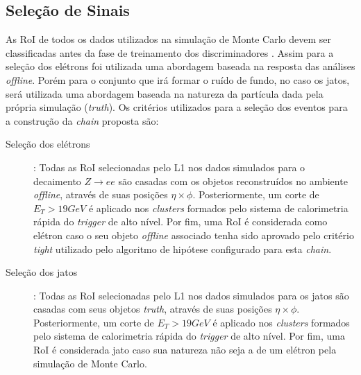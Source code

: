 \subsection{Seleção de Sinais}
\label{sec:selecao_sinais}
As RoI de todos os dados utilizados na simulação de Monte Carlo devem ser classificadas antes da fase de treinamento dos
discriminadores . Assim para a seleção dos elétrons foi utilizada uma abordagem baseada na resposta das análises \textit{offline}. Porém
para o conjunto que irá formar o ruído de fundo, no caso os jatos, será utilizada uma abordagem baseada na natureza da partícula
dada pela própria simulação (\textit{truth}). Os critérios utilizados para a seleção dos eventos para a construção da \textit{chain} proposta são:

\begin{description}
\item[Seleção dos elétrons]: Todas as RoI selecionadas pelo L1 nos dados simulados para o decaimento $Z\rightarrow ee$ são casadas com 
os objetos reconstruídos no ambiente \textit{offline}, através de suas posições $\eta\times\phi$. Posteriormente, um corte de $E_{T}>19GeV$ é aplicado nos \textit{clusters} formados pelo
sistema de calorimetria rápida do \textit{trigger} de alto nível. Por fim, uma RoI é considerada como elétron caso o seu objeto \textit{offline} associado tenha sido aprovado pelo critério \textit{tight} utilizado 
pelo algoritmo de hipótese configurado para esta \textit{chain}.

\item[Seleção dos jatos]: Todas as RoI selecionadas pelo L1 nos dados simulados para os jatos são casadas com seus objetos \textit{truth}, através de suas posições $\eta\times\phi$. 
Posteriormente, um corte de $E_{T}>19GeV$ é aplicado nos \textit{clusters} formados pelo sistema de calorimetria rápida do \textit{trigger} de alto nível. Por fim, uma RoI é considerada 
jato caso sua natureza não seja a de um elétron pela simulação de Monte Carlo.

\end{description}


